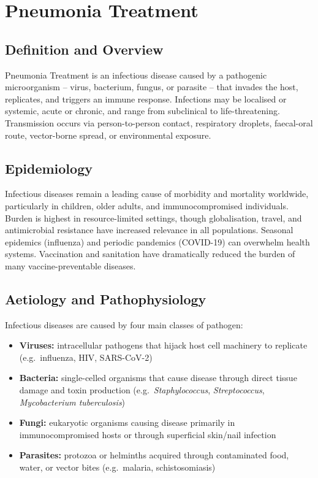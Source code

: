 \chapter{Pneumonia Treatment}

\section*{Definition and Overview}
Pneumonia Treatment is an infectious disease caused by a pathogenic microorganism -- virus, bacterium, fungus, or parasite -- that invades the host, replicates, and triggers an immune response. Infections may be localised or systemic, acute or chronic, and range from subclinical to life-threatening. Transmission occurs via person-to-person contact, respiratory droplets, faecal-oral route, vector-borne spread, or environmental exposure.

\section*{Epidemiology}
Infectious diseases remain a leading cause of morbidity and mortality worldwide, particularly in children, older adults, and immunocompromised individuals. Burden is highest in resource-limited settings, though globalisation, travel, and antimicrobial resistance have increased relevance in all populations. Seasonal epidemics (influenza) and periodic pandemics (COVID-19) can overwhelm health systems. Vaccination and sanitation have dramatically reduced the burden of many vaccine-preventable diseases.

\section*{Aetiology and Pathophysiology}
Infectious diseases are caused by four main classes of pathogen:

\begin{itemize}
    \item \textbf{Viruses:} intracellular pathogens that hijack host cell machinery to replicate (e.g.\ influenza, HIV, SARS-CoV-2)
    \item \textbf{Bacteria:} single-celled organisms that cause disease through direct tissue damage and toxin production (e.g.\ \textit{Staphylococcus}, \textit{Streptococcus}, \textit{Mycobacterium tuberculosis})
    \item \textbf{Fungi:} eukaryotic organisms causing disease primarily in immunocompromised hosts or through superficial skin/nail infection
    \item \textbf{Parasites:} protozoa or helminths acquired through contaminated food, water, or vector bites (e.g.\ malaria, schistosomiasis)
\end{itemize}

